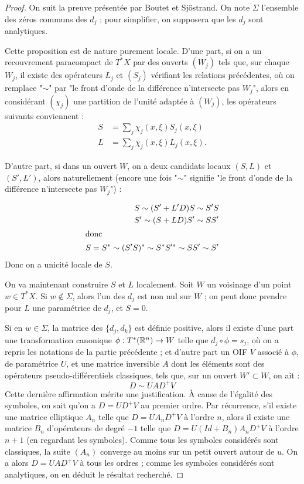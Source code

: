 \begin{proof}
  On suit la preuve présentée par Boutet et Sjöstrand. On note $\Sigma$ l'ensemble des zéros communs des $d_j$ ; pour simplifier, on supposera que les $d_j$ sont analytiques.
  
  Cette proposition est de nature purement locale. D'une part, si on a un recouvrement paracompact de $T^*X$ par des ouverts $(W_j)$ tels que, sur chaque $W_j$, il existe des opérateurs $L_j$ et $(S_j)$ vérifiant les relations précédentes, où on remplace "$\sim$" par "le front d'onde de la différence n'intersecte pas $W_j$", alors en considérant $(\chi_j)$ une partition de l'unité adaptée à $(W_j)$, les opérateurs suivants conviennent :
  \begin{align*}
    S &= \sum_j \chi_j(x,\xi) S_j(x,\xi)\\
    L &= \sum_j \chi_j(x,\xi) L_j(x,\xi).
  \end{align*}

  D'autre part, si dans un ouvert $W$, on a deux candidats locaux $(S,L)$ et $(S',L')$, alors naturellement (encore une fois "$\sim$" signifie "le front d'onde de la différence n'intersecte pas $W_j$") :
  
  \begin{align*}
    S \sim (S'+L'D)S \sim S'S\\
    S' \sim (S+LD)S' \sim SS'\\
    \intertext{donc}
    S=S^* \sim (S'S)^* \sim S^*S'^* \sim SS' \sim S'
  \end{align*}
  Donc on a unicité locale de $S$.
  
  On va maintenant construire $S$ et $L$ localement. Soit $W$ un voisinage d'un point $w \in T^*X$. Si $w \notin \Sigma$, alors l'un des $d_j$ est non nul sur $W$ ; on peut donc prendre pour $L$ une paramétrice de $d_j$, et $S=0$.
  
  Si en $w\in \Sigma$, la matrice des $\{d_j,\overline{d_k}\}$ est définie positive, alors il existe d'une part une transformation canonique $\phi : T^*(\mathbb{R}^n) \to W$ telle que $d_j \circ \phi = s_j$, où on a repris les notations de la partie précédente ; et d'autre part un OIF $V$ associé à $\phi$, de paramétrice $U$, et une matrice inversible $A$ dont les éléments sont des opérateurs pseudo-différentiels classiques, tels que, sur un ouvert $W' \subset W$, on ait :
  \begin{equation*}
    D \sim UAD^+V
  \end{equation*}
  Cette dernière affirmation mérite une justification. À cause de l'égalité des symboles, on sait qu'on a $D=UD^+V$ au premier ordre. Par récurrence, s'il existe une matrice elliptique $A_n$ telle que $D=UA_nD^+V$ à l'ordre $n$, alors il existe une matrice $B_n$ d'opérateurs de degré $-1$ telle que $D=U(Id+B_n)A_nD^+V$ à l'ordre $n+1$ (en regardant les symboles). Comme tous les symboles considérés sont classiques, la suite $(A_n)$ converge au moins sur un petit ouvert autour de $u$. On a alors $D=UAD^+V$ à tous les ordres ; comme les symboles considérés sont analytiques, on en déduit le résultat recherché.
  

\end{proof}
